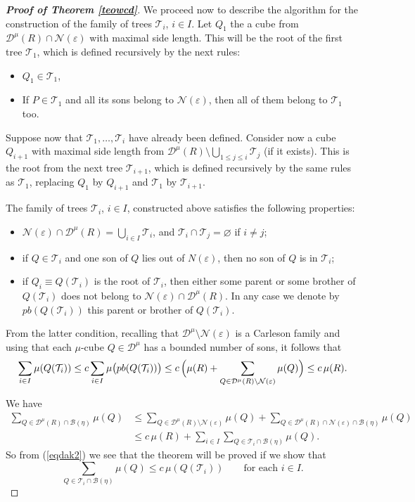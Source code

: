 \documentclass[11pt]{amsart}
\newcommand{\DD}{{\mathcal D}}
\newcommand{\BZ}{{\mathcal B}}
\newcommand{\NN}{{\mathcal N}}
\newcommand{\TT}{{\mathcal T}}
\newcommand{\rf}[1]{{(\ref{#1})}}
\newcommand{\ve}{{\varepsilon}}
\theoremstyle{definition}
\theoremstyle{remark}
\numberwithin{equation}{section}
\begin{document}
\begin{proof}[\bf Proof of Theorem \ref{teowcd}]
We proceed now to describe the algorithm for the construction of the family of trees  $\TT_i$,
$i\in I$. Let $Q_1$ the a cube from $\DD^\mu(R)\cap\NN(\ve)$ with maximal side length. This will be the 
root of the first tree $\TT_1$, which is defined recursively by the next rules:
\begin{itemize}
\item $Q_1\in\TT_1$,
\item If $P\in\TT_1$ and all its sons belong to $\NN(\ve)$, then all of them belong to $\TT_1$ too.
\end{itemize}

Suppose now that $\TT_1,\ldots,\TT_i$ have already been defined. Consider now a cube $Q_{i+1}$ with
maximal side length from $\DD^\mu(R)\setminus \bigcup_{1\leq j\leq i}\TT_j$ (if it exists). This is the root from the next tree $\TT_{i+1}$, which is defined recursively by the same rules as $\TT_1$, replacing $Q_1$ by $Q_{i+1}$ and $\TT_1$ by $\TT_{i+1}$.

The family of trees $\TT_i$, $i\in I$, constructed above satisfies the following properties:
\begin{itemize}
\item $\NN(\ve)\cap\DD^\mu(R) = \bigcup_{i\in I} \TT_i$, and $\TT_i\cap\TT_j=\varnothing$ if $i\neq j$;

\item if $Q\in\TT_i$ and one son of $Q$ lies out of $N(\ve)$, then no son of $Q$ is in $\TT_i$;

\item if $Q_i\equiv Q(\TT_i)$ is the root of $\TT_i$, then either some parent or some brother of $Q(\TT_i)$ does not belong to $\NN(\ve)\cap\DD^\mu(R)$. In any case we denote  by $pb(Q(\TT_i))$ this parent or brother of $Q(\TT_i)$.

\end{itemize}

From the latter condition, recalling that $\DD^\mu\setminus\NN(\ve)$ is a Carleson family and using
that each $\mu$-cube $Q\in\DD^\mu$ has a bounded number of sons,
it follows that 
\begin{equation}\label{eqdak2}
\sum_{i\in I} \mu(Q(\TT_i))\leq c\sum_{i\in I} \mu\bigl(pb(Q(\TT_i))\bigr) \leq c\,
\Bigl(\mu(R) + \sum_{Q\in \DD^\mu(R)\setminus \NN(\ve)} \mu(Q)\Bigr) \leq c\,\mu(R).
\end{equation}

We have
\begin{align*}
\sum_{Q\in\DD^\mu(R)\cap\BZ(\eta)}\mu(Q) & \leq 
\sum_{Q\in\DD^\mu(R)\setminus \NN(\ve)}\mu(Q)  + \sum_{Q\in\DD^\mu(R)\cap \NN(\ve)\cap\BZ(\eta)}\mu(Q)\\
&
\leq c\,\mu(R) + \sum_{i\in I} \sum_{Q\in \TT_i\cap \BZ(\eta)}\mu(Q).
\end{align*}
So from \rf{eqdak2} we see that the theorem will be proved if we show that
\begin{equation}\label{eqti1}
\sum_{Q\in \TT_i\cap \BZ(\eta)}\mu(Q) \leq c\,\mu(Q(\TT_i))\qquad \mbox{for each $i\in I$.}
\end{equation}


\end{proof}
\end{document}
